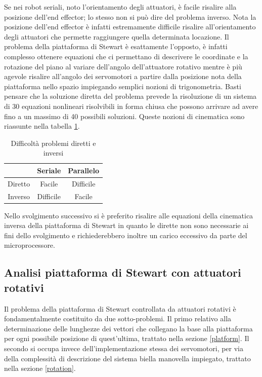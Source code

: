\documentclass[12pt,twoside,openright]{article}
\begin{document}
Se nei robot seriali, noto l'orientamento degli attuatori, è facile risalire alla posizione dell'end effector; lo stesso non si può dire del problema inverso. Nota la posizione dell'end effector è infatti estremamente difficile risalire all'orientamento degli attuatori che permette raggiungere quella determinata locazione. Il problema della piattaforma di Stewart è esattamente l'opposto, è infatti complesso ottenere equazioni che ci permettano di descrivere le coordinate e la rotazione del piano al variare dell'angolo dell'attuatore rotativo mentre è più agevole risalire all'angolo dei servomotori a partire dalla posizione nota della piattaforma nello spazio impiegando semplici nozioni di trigonometria. Basti pensare che la soluzione diretta del problema prevede la risoluzione di un sistema di 30 equazioni nonlineari risolvibili in forma chiusa che possono arrivare ad avere fino a un massimo di 40 possibili soluzioni.\cite{cinematicadiretta2} Queste nozioni di cinematica sono riassunte nella tabella \ref{fig:tabella}.
\begin{table}[h!]
\centering
\begin{tabular}{c|cc}
        & Seriale   & Parallelo  \\ 
\hline
Diretto & Facile    & Difficile  \\
Inverso & Difficile & Facile    
\end{tabular}
\caption{Difficoltà problemi diretti e inversi} \label{fig:tabella}
\end{table}
Nello svolgimento successivo si è preferito risalire alle equazioni della cinematica inversa della piattaforma di Stewart in quanto le dirette non sono necessarie ai fini dello svolgimento e richiederebbero inoltre un carico eccessivo da parte del microprocessore.



\subsection{Analisi piattaforma di Stewart con attuatori rotativi}\label{analisi}

Il problema della piattaforma di Stewart controllata da attuatori rotativi è fondamentalmente costituito da due sotto-problemi.
Il primo relativo alla determinazione delle lunghezze dei vettori che collegano la base alla piattaforma per ogni possibile posizione di quest'ultima, trattato nella sezione \ref{platform}. Il secondo si occupa invece dell'implementazione stessa dei servomotori, per via della complessità di descrizione del sistema biella manovella impiegato, trattato nella sezione \ref{rotation}. 
\end{document}
